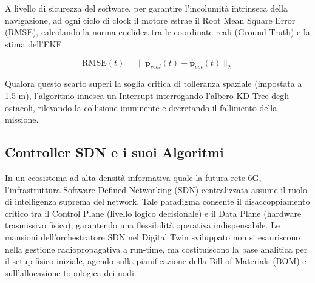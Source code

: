\documentclass[twoside]{article}
\begin{document}
A livello di sicurezza del software, per garantire l'incolumità intrinseca della navigazione, ad ogni ciclo di clock il motore estrae il Root Mean Square Error (RMSE), calcolando la norma euclidea tra le coordinate reali (Ground Truth) e la stima dell'EKF:

\begin{equation}
\text{RMSE}(t) = \|\mathbf{p}_{real}(t) - \mathbf{\hat{p}}_{est}(t)\|_2
\label{eq:ekf_rmse}
\end{equation}

Qualora questo scarto superi la soglia critica di tolleranza spaziale (impostata a 1.5 m), l'algoritmo innesca un Interrupt interrogando l'albero KD-Tree degli ostacoli, rilevando la collisione imminente e decretando il fallimento della missione.
\subsection{Controller SDN e i suoi Algoritmi}

In un ecosistema ad alta densità informativa quale la futura rete 6G, l'infrastruttura Software-Defined Networking (SDN) centralizzata assume il ruolo di intelligenza suprema del network. Tale paradigma consente il disaccoppiamento critico tra il Control Plane (livello logico decisionale) e il Data Plane (hardware trasmissivo fisico), garantendo una flessibilità operativa indispensabile. Le mansioni dell'orchestratore SDN nel Digital Twin sviluppato non si esauriscono nella gestione radiopropagativa a run-time, ma costituiscono la base analitica per il setup fisico iniziale, agendo sulla pianificazione della Bill of Materials (BOM) e sull'allocazione topologica dei nodi.
\end{document}
